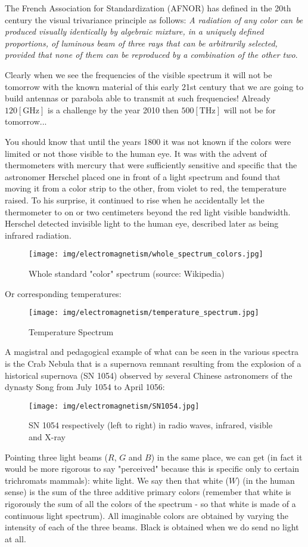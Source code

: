 	The French Association for Standardization (AFNOR) has defined in the 20th century the visual trivariance principle as follows:\textit{ A radiation of any color can be produced visually identically by algebraic mixture, in a uniquely defined proportions, of luminous beam of three rays that can be arbitrarily selected, provided that none of them can be reproduced by a combination of the other two}.
	
	Clearly when we see the frequencies of the visible spectrum it will not be tomorrow with the known material of this early 21st century that we are going to build antennas or parabola able to transmit at such frequencies! Already $120 [\text{GHz}]$ is a challenge by the year 2010 then $500 [\text{THz}]$ will not be for tomorrow...
	
	You should know that until the years 1800 it was not known if the colors were limited or not those visible to the human eye. It was with the advent of thermometers with mercury that were sufficiently sensitive and specific that the astronomer Herschel placed one in front of a light spectrum and found that moving it from a color strip to the other, from violet to red, the temperature raised. To his surprise, it continued to rise when he accidentally let the thermometer to on or two centimeters beyond the red light visible bandwidth. Herschel detected invisible light to the human eye, described later as being infrared radiation.
	\begin{figure}[H]
		\centering
		\texttt{[image: img/electromagnetism/whole\_spectrum\_colors.jpg]}
		\caption[Whole standard "color" spectrum]{Whole standard "color" spectrum (source: Wikipedia)}
	\end{figure}
	Or corresponding temperatures:
	\begin{figure}[H]
		\centering
		\texttt{[image: img/electromagnetism/temperature\_spectrum.jpg]}
		\caption{Temperature Spectrum}
	\end{figure}
	A magistral and pedagogical example of what can be seen in the various spectra is the Crab Nebula that is a supernova remnant resulting from the explosion of a historical supernova (SN 1054) observed by several Chinese astronomers of the dynasty Song from July 1054 to April 1056:
	\begin{figure}[H]
		\centering
		\texttt{[image: img/electromagnetism/SN1054.jpg]}
		\caption{SN 1054 respectively (left to right) in radio waves, infrared, visible and X-ray}
	\end{figure}
	Pointing three light beams ($R$, $G$ and $B$) in the same place, we can get (in fact it would be more rigorous to say "perceived" because this is specific only to certain trichromats mammals): white light. We say then that white ($W$) (in the human sense) is the sum of the three additive primary colors (remember that white is rigorously the sum of all the colors of the spectrum - so that white is made of a continuous light spectrum). All imaginable colors are obtained by varying the intensity of each of the three beams. Black is obtained when we do send no light at all.
	
